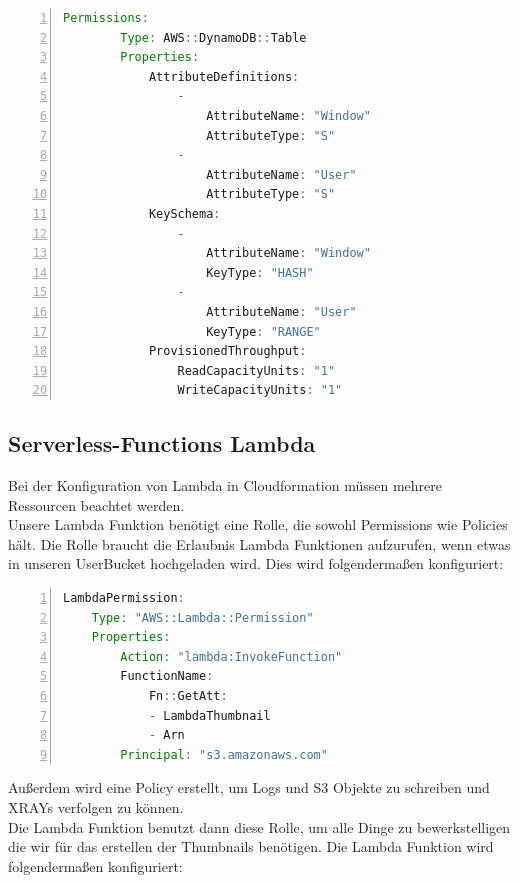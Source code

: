 \documentclass[a4paper, 12pt]{scrreprt}
\begin{document}


\begin{lstlisting}[xleftmargin=\parindent,numbers=left,numberstyle=\small,numbersep=8pt,frame=L,mathescape=true, basicstyle=\small, language=Java, lineskip={1.0pt}]
Permissions:
        Type: AWS::DynamoDB::Table
        Properties:
            AttributeDefinitions:
                -
                    AttributeName: "Window"
                    AttributeType: "S"
                -
                    AttributeName: "User"
                    AttributeType: "S"
            KeySchema:
                -
                    AttributeName: "Window"
                    KeyType: "HASH"
                -
                    AttributeName: "User"
                    KeyType: "RANGE"
            ProvisionedThroughput:
                ReadCapacityUnits: "1"
                WriteCapacityUnits: "1"
\end{lstlisting}



\subsection{Serverless-Functions Lambda}
Bei der Konfiguration von Lambda in Cloudformation müssen mehrere Ressourcen beachtet werden. \\
Unsere Lambda Funktion benötigt eine Rolle, die sowohl Permissions wie Policies hält. Die Rolle braucht die Erlaubnis Lambda Funktionen aufzurufen, wenn etwas in unseren UserBucket hochgeladen wird. Dies wird folgendermaßen konfiguriert:

\begin{lstlisting}[xleftmargin=\parindent,numbers=left,numberstyle=\small,numbersep=8pt,frame=L,mathescape=true, basicstyle=\small, language=Java, lineskip={1.0pt}]
LambdaPermission:
    Type: "AWS::Lambda::Permission"
    Properties: 
        Action: "lambda:InvokeFunction"
        FunctionName:
            Fn::GetAtt:
            - LambdaThumbnail
            - Arn
        Principal: "s3.amazonaws.com"
\end{lstlisting}

Außerdem wird eine Policy erstellt, um Logs und S3 Objekte zu schreiben und XRAYs verfolgen zu können.\\
Die Lambda Funktion benutzt dann diese Rolle, um alle Dinge zu bewerkstelligen die wir für das erstellen der Thumbnails benötigen. Die Lambda Funktion wird folgendermaßen konfiguriert:
\end{document}
